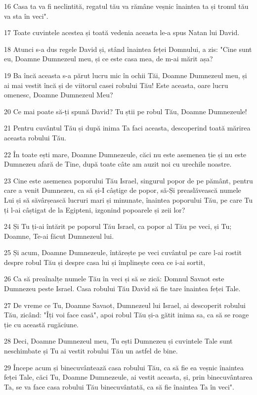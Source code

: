 \par 16 Casa ta va fi neclintită, regatul tău va rămâne veșnic înaintea ta și tronul tău va sta în veci".
\par 17 Toate cuvintele acestea și toată vedenia aceasta le-a spus Natan lui David.
\par 18 Atunci s-a dus regele David și, stând înaintea feței Domnului, a zis: "Cine sunt eu, Doamne Dumnezeul meu, și ce este casa mea, de m-ai mărit așa?
\par 19 Ba încă aceasta s-a părut lucru mic în ochii Tăi, Doamne Dumnezeul meu, și ai mai vestit încă și de viitorul casei robului Tău! Este aceasta, oare lucru omenesc, Doamne Dumnezeul Meu?
\par 20 Ce mai poate să-ți spună David? Tu știi pe robul Tău, Doamne Dumnezeule!
\par 21 Pentru cuvântul Tău și după inima Ta faci aceasta, descoperind toată mărirea aceasta robului Tău.
\par 22 În toate ești mare, Doamne Dumnezeule, căci nu este asemenea ție și nu este Dumnezeu afară de Tine, după toate câte am auzit noi cu urechile noastre.
\par 23 Cine este asemenea poporului Tău Israel, singurul popor de pe pământ, pentru care a venit Dumnezeu, ca să și-I câștige de popor, să-Și preaslăvească numele Lui și să săvârșească lucruri mari și minunate, înaintea poporului Tău, pe care Tu ți l-ai câștigat de la Egipteni, izgonind popoarele și zeii lor?
\par 24 Și Tu ți-ai întărit pe poporul Tău Israel, ca popor al Tău pe veci, și Tu; Doamne, Te-ai făcut Dumnezeul lui.
\par 25 Și acum, Doamne Dumnezeule, întărește pe veci cuvântul pe care l-ai rostit despre robul Tău și despre casa lui și împlinește ceea ce i-ai sortit,
\par 26 Ca să preaînalțe numele Tău în veci și să se zică: Domnul Savaot este Dumnezeu peste Israel. Casa robului Tău David să fie tare înaintea feței Tale.
\par 27 De vreme ce Tu, Doamne Savaot, Dumnezeul lui Israel, ai descoperit robului Tău, zicând: "Îți voi face casă", apoi robul Tău și-a gătit inima sa, ca să se roage ție cu această rugăciune.
\par 28 Deci, Doamne Dumnezeul meu, Tu ești Dumnezeu și cuvintele Tale sunt neschimbate și Tu ai vestit robului Tău un astfel de bine.
\par 29 Începe acum și binecuvântează casa robului Tău, ca să fie ea veșnic înaintea feței Tale, căci Tu, Doamne Dumnezeule, ai vestit aceasta, și, prin binecuvântarea Ta, se va face casa robului Tău binecuvântată, ca să fie înaintea Ta în veci".

